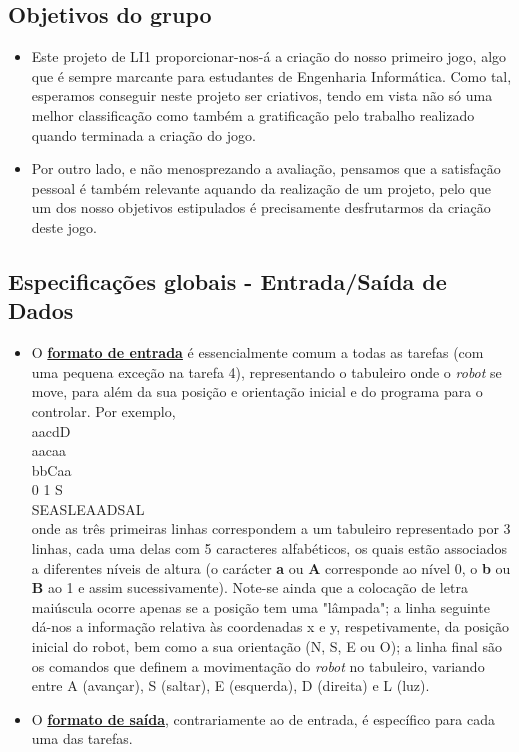 \documentclass[12pt, a4paper]{article}
\begin{document}
\subsection{Objetivos do grupo}

\begin{itemize}
\item Este projeto de LI1 proporcionar-nos-á a criação do nosso primeiro jogo, algo que é sempre marcante para estudantes de Engenharia Informática. Como tal, esperamos conseguir neste projeto ser criativos, tendo em vista não só uma melhor classificação como também a gratificação pelo trabalho realizado quando terminada a criação do jogo.  
\item Por outro lado, e não menosprezando a avaliação, pensamos que a satisfação pessoal é também relevante aquando da realização de um projeto, pelo que um dos nosso objetivos estipulados é precisamente desfrutarmos da criação deste jogo. 
\end{itemize}

\subsection{Especificações globais - Entrada/Saída de Dados}

\begin{itemize}
\item O \underline{\textbf{formato de entrada}} é essencialmente comum a todas as tarefas (com uma pequena exceção na tarefa 4), representando o tabuleiro onde o \textit{robot} se move, para além da sua posição e orientação inicial e do programa para o controlar. Por exemplo, \\

aacdD \\
aacaa \\
bbCaa \\
0 1 S \\
SEASLEAADSAL \\

onde as três primeiras linhas correspondem a um tabuleiro representado por 3 linhas, cada uma delas com 5 caracteres alfabéticos, os quais estão associados a diferentes níveis de altura (o carácter \textbf{a} ou \textbf{A} corresponde ao nível 0, o \textbf{b} ou \textbf{B} ao 1 e assim sucessivamente). Note-se ainda que a colocação de letra maiúscula ocorre apenas se a posição tem uma "lâmpada"; a linha seguinte dá-nos a informação relativa às coordenadas x e y, respetivamente, da posição inicial do robot, bem como a sua orientação (N, S, E ou O); a linha final são os comandos que definem a movimentação do \textit{robot} no tabuleiro, variando entre A (avançar), S (saltar), E (esquerda), D (direita) e L (luz).

\item O \underline{\textbf{formato de saída}}, contrariamente ao de entrada, é específico para cada uma das tarefas.
\end{itemize}
\end{document}

